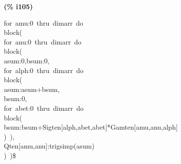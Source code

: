 \documentclass[fleqn]{article}
\begin{document}
\noindent
\begin{minipage}[t]{4.000000em}\color{red}\bfseries
(\% i105)	
\end{minipage}
\begin{minipage}[t]{\textwidth}\color{blue}
for\ amu:0\ thru\ dimarr\ do\\
block(\\
for\ anu:0\ thru\ dimarr\ do\\
block(\\
asum:0,bsum:0,\\
for\ alph:0\ thru\ dimarr\ do\\
block(\\
asum:asum+bsum,\\
bsum:0,\\
for\ abet:0\ thru\ dimarr\ do\\
block(\\
bsum:bsum+Sigten[alph,abet,abet]*Gamten[amu,anu,alph]\ \ \\
)\ ),\\
Qten[amu,anu]:trigsimp(asum)\ \\
)\ )\$
\end{minipage}

\noindent%
\end{document}
